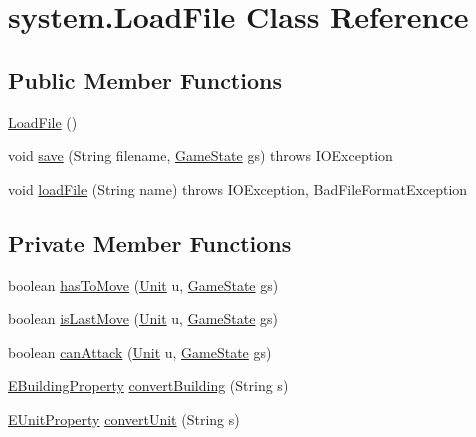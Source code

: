 \hypertarget{classsystem_1_1_load_file}{}\section{system.\+Load\+File Class Reference}
\label{classsystem_1_1_load_file}
\subsection*{Public Member Functions}
\begin{DoxyCompactItemize}
\item 
\mbox{\hyperlink{classsystem_1_1_load_file_ac5d64f03a0aeabd44ea9c6b6514112e5}{Load\+File}} ()
\item 
void \mbox{\hyperlink{classsystem_1_1_load_file_ae74023593b3080a395c9816e3cf220d1}{save}} (String filename, \mbox{\hyperlink{classgame_1_1game_state_1_1_game_state}{Game\+State}} gs)  throws I\+O\+Exception 
\item 
void \mbox{\hyperlink{classsystem_1_1_load_file_adf1c31e03c1dd422118d122ef17dc96e}{load\+File}} (String name)  throws I\+O\+Exception, Bad\+File\+Format\+Exception 
\end{DoxyCompactItemize}
\subsection*{Private Member Functions}
\begin{DoxyCompactItemize}
\item 
boolean \mbox{\hyperlink{classsystem_1_1_load_file_a33ddd03f92888eb739d04f70f893e076}{has\+To\+Move}} (\mbox{\hyperlink{classgame_1_1board_1_1_unit}{Unit}} u, \mbox{\hyperlink{classgame_1_1game_state_1_1_game_state}{Game\+State}} gs)
\item 
boolean \mbox{\hyperlink{classsystem_1_1_load_file_a5d3c0a0b1a0c4fda2ebb8f992db8eeae}{is\+Last\+Move}} (\mbox{\hyperlink{classgame_1_1board_1_1_unit}{Unit}} u, \mbox{\hyperlink{classgame_1_1game_state_1_1_game_state}{Game\+State}} gs)
\item 
boolean \mbox{\hyperlink{classsystem_1_1_load_file_aa76e99fc2bb6200c6905b151c0092b3b}{can\+Attack}} (\mbox{\hyperlink{classgame_1_1board_1_1_unit}{Unit}} u, \mbox{\hyperlink{classgame_1_1game_state_1_1_game_state}{Game\+State}} gs)
\item 
\mbox{\hyperlink{enumrule_engine_1_1entity_1_1_e_building_property}{E\+Building\+Property}} \mbox{\hyperlink{classsystem_1_1_load_file_a56e36ed0f74cf5fc59a938e42d38bf13}{convert\+Building}} (String s)
\item 
\mbox{\hyperlink{enumrule_engine_1_1entity_1_1_e_unit_property}{E\+Unit\+Property}} \mbox{\hyperlink{classsystem_1_1_load_file_a3d783792d25f456b864b52e144533d79}{convert\+Unit}} (String s)
\end{DoxyCompactItemize}


